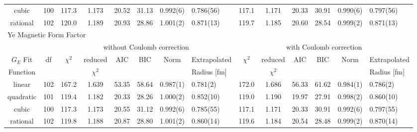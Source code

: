 \documentclass[10pt,superscriptaddress,aps,prc,twocolumn]{revtex4-1}
\begin{document}
\begin{table}
\begin{tabular}{cc|cccccl|cccccl}
cubic     & 100 & 117.3    & 1.173     & 20.52  & 31.13 & 0.992(6)   & 0.786(56) & 117.1    & 1.171     & 20.33  & 30.91  & 0.990(6)  & 0.797(56)    \\ 
rational  & 102 & 120.0    & 1.189     & 20.93  & 28.86 & 1.001(2)   & 0.871(13) & 119.7    & 1.185     & 20.60  & 28.54  & 0.999(2)  & 0.871(13)    \\ \hline \hline
\multicolumn{14}{l}{Ye Magnetic Form Factor}                                      \\ \hline
          &     & \multicolumn{6}{c}{without Coulomb correction}                 & \multicolumn{6}{|c}{with Coulomb correction} \\
$G_E$ Fit & df  & $\chi^2$ & reduced   & AIC    & BIC    & Norm      & Extrapolated    & $\chi^2$ & reduced   & AIC    & BIC    & Norm      & Extrapolated      \\  
Function  &     &          &$\chi^2$  &        &       &             & Radius [fm]      &          & $\chi^2$  &        &        &           & Radius [fm]    \\ \hline
linear    & 102 & 167.2    & 1.639    & 53.35  & 58.64 & 0.987(1)    & 0.781(2)  & 172.0    & 1.686     & 56.33  & 61.62  & 0.984(1)  & 0.786(2)    \\
quadratic & 101 & 119.4    & 1.182    & 20.33  & 28.26 & 1.000(2)    & 0.852(10) & 119.0    & 1.190     & 19.97  & 27.91  & 0.998(2)  & 0.860(10)    \\
cubic     & 100 & 117.3    & 1.173    & 20.55  & 31.12 & 0.992(6)    & 0.785(55) & 117.1    & 1.171     & 20.33  & 30.91  & 0.992(6)  & 0.797(55)    \\ 
rational  & 102 & 119.8    & 1.188    & 20.87  & 28.80 & 1.001(2)    & 0.860(14) & 119.6    & 1.184     & 20.54  & 28.48  & 0.999(2)  & 0.870(14)    \\ \hline \hline
\end{tabular}
\label{datatable}
\end{table}
\end{document}
